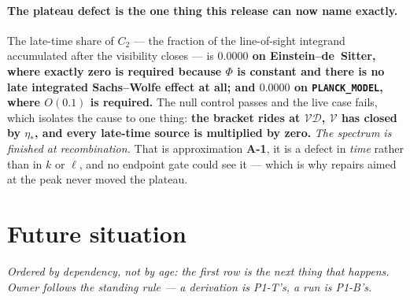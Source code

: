 \paragraph{The plateau defect is the one thing this release can now name
exactly.} The late-time share of $C_2$ --- the fraction of the line-of-sight
integrand accumulated after the visibility closes --- is \textbf{$0.0000$ on
Einstein--de~Sitter, where exactly zero is required because $\Phi$ is constant
and there is no late integrated Sachs--Wolfe effect at all; and $0.0000$ on
\texttt{PLANCK\_MODEL}, where $O(0.1)$ is required.} The null control passes
and the live case fails, which isolates the cause to one thing: \textbf{the
bracket rides at $\mathcal V\mathcal D$, $\mathcal V$ has closed by $\eta_*$,
and every late-time source is multiplied by zero.} \emph{The spectrum is
finished at recombination.} That is approximation \textbf{A-1}, it is a defect
in \emph{time} rather than in $k$ or $\ell$, and no endpoint gate could see it
--- which is why repairs aimed at the peak never moved the plateau.

\section{Future situation}
\label{sec:future-situation}

\emph{Ordered by dependency, not by age: the first row is the next thing that
happens. Owner follows the standing rule --- a derivation is P1-T's, a run is
P1-B's.}

